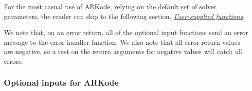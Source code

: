 \documentclass[letterpaper,10pt,english]{sphinxmanual}
\begin{document}
For the most casual use of ARKode, relying on the default set of
solver parameters, the reader can skip to the following section,
{\hyperref[c_interface/User_supplied:cinterface-usersupplied]{\emph{User-supplied functions}}}.

We note that, on an error return, all of the optional input functions
send an error message to the error handler function.  We also note
that all error return values are negative, so a test on the return
arguments for negative values will catch all errors.


\subsubsection{Optional inputs for ARKode}
\label{c_interface/User_callable:cinterface-arkodeinputtable}\label{c_interface/User_callable:optional-inputs-for-arkode}
\end{document}
